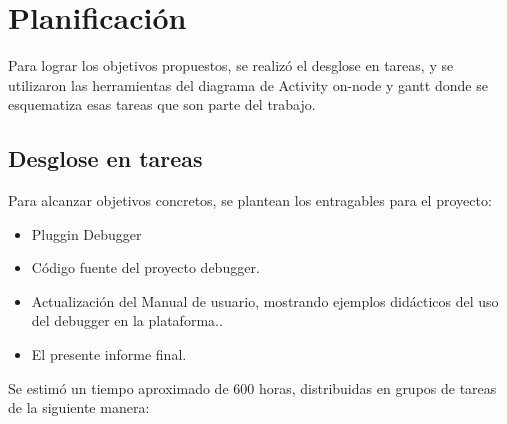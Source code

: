 \section{Planificación}
\label{sec:ejemplo}

Para lograr los objetivos propuestos, se realizó el desglose en tareas, y se utilizaron las herramientas del diagrama de Activity on-node y gantt donde se esquematiza esas tareas que son parte del trabajo.

\subsection{Desglose en tareas} 

Para alcanzar objetivos concretos, se plantean los entragables para el proyecto:

\begin{itemize}
	\item Pluggin Debugger	
	\item Código fuente del proyecto debugger.
	\item Actualización del Manual de usuario, mostrando ejemplos didácticos del uso del debugger en la plataforma..
	\item El presente informe final.
\end{itemize}

Se estimó un tiempo aproximado de 600 horas, distribuidas en grupos de tareas de
la siguiente manera:

